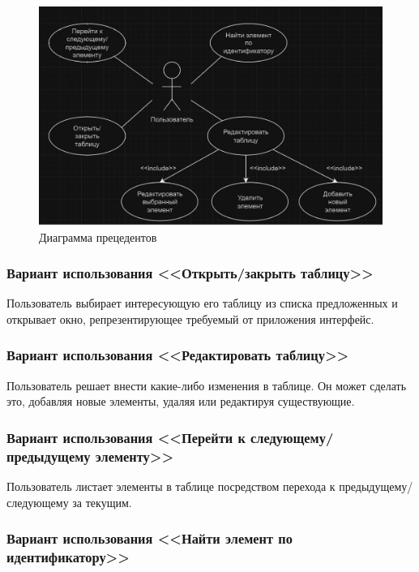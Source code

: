 \begin{figure}[ht]
	\centering
	\includegraphics[width=1\linewidth]{images/CommonScheme2}
	\caption{Диаграмма прецедентов}
	\label{fig:commonscheme2}
\end{figure}

\subsubsection{Вариант использования <<Открыть/закрыть таблицу>>}

Пользователь выбирает интересующую его таблицу из списка предложенных и открывает окно, репрезентирующее требуемый от приложения интерфейс.

\subsubsection{Вариант использования <<Редактировать таблицу>>}

Пользователь решает внести какие-либо изменения в таблице. Он может сделать это, добавляя новые элементы, удаляя или редактируя существующие.

\subsubsection{Вариант использования <<Перейти к следующему/предыдущему элементу>>}

Пользователь листает элементы в таблице посредством перехода к предыдущему/следующему за текущим.

\subsubsection{Вариант использования <<Найти элемент по идентификатору>>}

